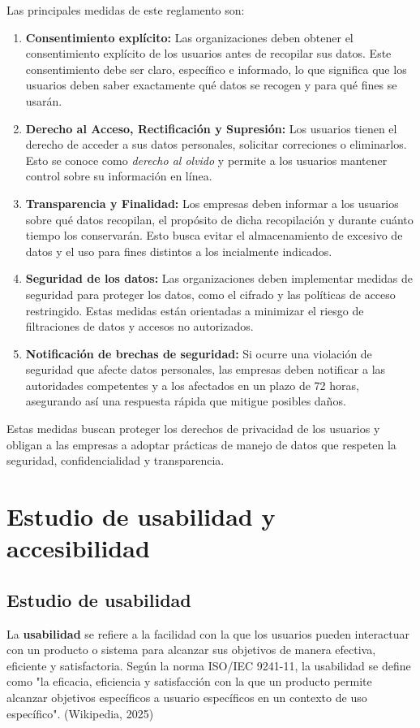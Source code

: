 Las principales medidas de este reglamento son:
\begin{enumerate}
    \item \textbf{Consentimiento explícito:} Las organizaciones deben obtener el consentimiento explícito de los usuarios antes de recopilar sus datos. Este consentimiento debe ser claro, específico e informado, lo que significa que los usuarios deben saber exactamente qué datos se recogen y para qué fines se usarán.
    \item \textbf{Derecho al Acceso, Rectificación y Supresión:} Los usuarios tienen el derecho de acceder a sus datos personales, solicitar correciones o eliminarlos. Esto se conoce como \textit{derecho al olvido} y permite a los usuarios mantener control sobre su información en línea.
    \item \textbf{Transparencia y Finalidad:} Los empresas deben informar a los usuarios sobre qué datos recopilan, el propósito de dicha recopilación y durante cuánto tiempo los conservarán. Esto busca evitar el almacenamiento de excesivo de datos y el uso para fines distintos a los incialmente indicados.
    \item \textbf{Seguridad de los datos:} Las organizaciones deben implementar medidas de seguridad para proteger los datos, como el cifrado y las políticas de acceso restringido. Estas medidas están orientadas a minimizar el riesgo de filtraciones de datos y accesos no autorizados.
    \item \textbf{Notificación de brechas de seguridad:} Si ocurre una violación de seguridad que afecte datos personales, las empresas deben notificar a las autoridades competentes y a los afectados en un plazo de 72 horas, asegurando así una respuesta rápida que mitigue posibles daños.
\end{enumerate}

Estas medidas buscan proteger los derechos de privacidad de los usuarios y obligan a las empresas a adoptar prácticas de manejo de datos que respeten la seguridad, confidencialidad y transparencia.


\newpage

\section{Estudio de usabilidad y accesibilidad}
\subsection{Estudio de usabilidad}
La \textbf{usabilidad} se refiere a la facilidad con la que los usuarios pueden interactuar con un producto o sistema para alcanzar sus 
objetivos de manera efectiva, eficiente y satisfactoria. Según la norma ISO/IEC 9241-11, la usabilidad se define como "la eficacia, eficiencia y satisfacción 
con la que un producto permite alcanzar objetivos específicos a usuario específicos en un contexto de uso específico". (Wikipedia, 2025)


